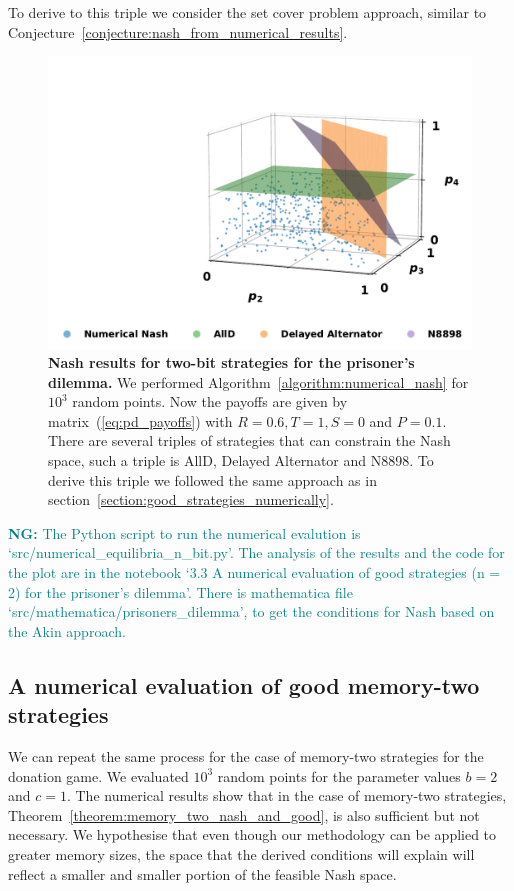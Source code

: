 \documentclass{article}
\theoremstyle{definition}
\newcommand{\nikoleta}[1]{\textcolor{teal}{{\bf NG:} #1}}
\begin{document}
  To derive to this triple we consider the set cover problem approach, similar
  to Conjecture~\ref{conjecture:nash_from_numerical_results}.

\begin{figure}[!htbp]
  \centering
  \includegraphics[width=.55\textwidth]{static/two_bit_reactive_numerical_results_prisoners_dilemma.pdf}
  \caption{\textbf{Nash results for two-bit strategies for the prisoner's dilemma.}
  We performed Algorithm~\ref{algorithm:numerical_nash} for \(10 ^ 3\) random
  points. Now the payoffs are given by matrix~(\ref{eq:pd_payoffs})
  with \(R=0.6, T=1, S=0\) and \(P=0.1\). There are several triples of
  strategies that can constrain the Nash space, such a triple is AllD, Delayed
  Alternator and N8898. To derive this triple we followed the same approach as
  in section~\ref{section:good_strategies_numerically}.}
  \label{fig:numerical_results_prisoners_dilemma}
\end{figure}

\nikoleta{The Python script to run the numerical evalution is
`src/numerical\_equilibria\_n\_bit.py'. The analysis of the results and the code
for the plot are in the notebook `3.3 A numerical evaluation of good strategies
(n = 2) for the prisoner's dilemma'. There is mathematica file
`src/mathematica/prisoners\_dilemma', to get the conditions for Nash based on
the Akin approach.}

\subsection{A numerical evaluation of good memory-two strategies}\label{section:good_strategies_numerically_mem_two}

We can repeat the same process for the case of memory-two strategies for the
donation game. We evaluated \(10^3\) random points for the parameter values \(b=2\)
and \(c=1\). The numerical results show that in the case of memory-two strategies,
Theorem~\ref{theorem:memory_two_nash_and_good}, is also sufficient but not
necessary. We hypothesise that even though our methodology can be applied to
greater memory sizes, the space that the derived conditions will explain will
reflect a smaller and smaller portion of the feasible Nash space.
\end{document}
